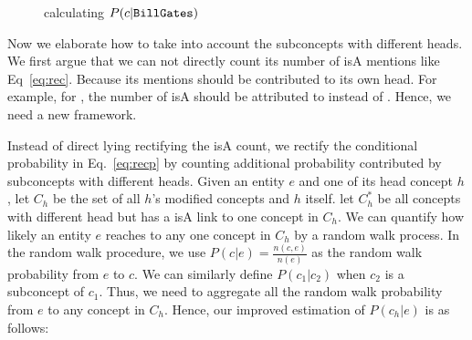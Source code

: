 \begin{figure}[!hptb]
\label{fig:pgge}
\centering
{}%
\caption{calculating $P({c}|{\tt Bill Gates})$ }
\end{figure}

%
Now we elaborate how to take into account the subconcepts with different heads. We first argue that we can not directly count its number of isA mentions like Eq~\ref{eq:rec}. Because its mentions should be contributed to its own head. For example, for , the number of  isA  should be attributed to  instead of .
Hence, we need a new framework. 

Instead of direct lying rectifying the isA count, we rectify the conditional probability in Eq.~\ref{eq:recp} by counting additional probability contributed by subconcepts with different heads. Given an entity $e$ and one of its head concept $h$, let $C_h$ be the set of all $h$'s modified concepts and $h$ itself. let $C^*_h$ be all concepts with different head but has a isA link to one concept in $C_h$. We can quantify how likely an entity $e$ reaches to any one concept in $C_h$ by a random walk process. In the random walk procedure, we use $P(c|e)=\frac{n(c,e)}{n(e)}$ as the random walk probability from $e$ to $c$. We can similarly define $P(c_1|c_2)$ when $c_2$ is a subconcept of $c_1$.  Thus, we need to aggregate all the random walk probability from $e$ to any concept in $C_h$.
Hence, our improved estimation of $P({c_h}|e)$ is as follows:

